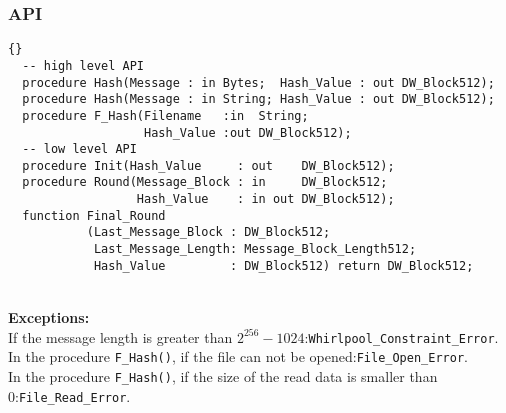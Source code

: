 \subsubsection*{API}
\begin{lstlisting}{}
  -- high level API
  procedure Hash(Message : in Bytes;  Hash_Value : out DW_Block512);
  procedure Hash(Message : in String; Hash_Value : out DW_Block512);
  procedure F_Hash(Filename   :in  String; 
                   Hash_Value :out DW_Block512);
  -- low level API
  procedure Init(Hash_Value     : out    DW_Block512);
  procedure Round(Message_Block : in     DW_Block512;
                  Hash_Value    : in out DW_Block512);
  function Final_Round
           (Last_Message_Block : DW_Block512;
            Last_Message_Length: Message_Block_Length512;
            Hash_Value         : DW_Block512) return DW_Block512;
\end{lstlisting}\\
\textbf{Exceptions:}\\
If the message length is greater than $2^{256}-1024$:\quad \texttt{Whirlpool\_Constraint\_Error}.\\ 
In the procedure \texttt{F\_Hash()}, if the file can not be opened:\quad\texttt{File\_Open\_Error}.\\
In the procedure \texttt{F\_Hash()}, if the size of the read data is smaller than 0:\quad\texttt{File\_Read\_Error}.\\